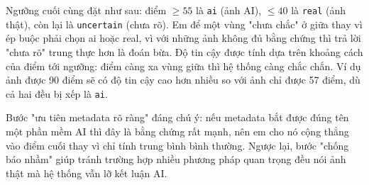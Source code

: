 Ngưỡng cuối cùng đặt như sau: điểm $\geq 55$ là \texttt{ai} (ảnh AI), $\leq 40$ là \texttt{real} (ảnh thật), còn lại là \texttt{uncertain} (chưa rõ). Em để một vùng "chưa chắc" ở giữa thay vì ép buộc phải chọn ai hoặc real, vì với những ảnh không đủ bằng chứng thì trả lời "chưa rõ" trung thực hơn là đoán bừa. Độ tin cậy được tính dựa trên khoảng cách của điểm tới ngưỡng: điểm càng xa vùng giữa thì hệ thống càng chắc chắn. Ví dụ ảnh được 90 điểm sẽ có độ tin cậy cao hơn nhiều so với ảnh chỉ được 57 điểm, dù cả hai đều bị xếp là \texttt{ai}.

Bước "ưu tiên metadata rõ ràng" đáng chú ý: nếu metadata bắt được đúng tên một phần mềm AI thì đây là bằng chứng rất mạnh, nên em cho nó cộng thẳng vào điểm cuối thay vì chỉ tính trung bình bình thường. Ngược lại, bước "chống báo nhầm" giúp tránh trường hợp nhiều phương pháp quan trọng đều nói ảnh thật mà hệ thống vẫn lỡ kết luận AI.
